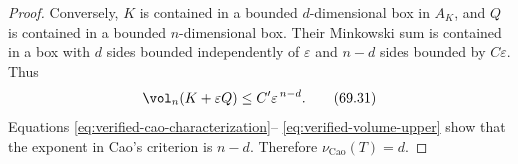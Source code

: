 \begin{proof}
Conversely, \(K\) is contained in a bounded \(d\)-dimensional box in
\(A_K\), and \(Q\) is contained in a bounded \(n\)-dimensional box.
Their Minkowski sum is contained in a box with \(d\) sides bounded
independently of \(\varepsilon\) and \(n-d\) sides bounded by
\(C\varepsilon\). Thus
\[
                \vol_n(K+\varepsilon Q)
                       \leq C'\varepsilon^{\,n-d}.
\tag{69.31}\label{eq:verified-volume-upper}
\]
Equations \eqref{eq:verified-cao-characterization}--
\eqref{eq:verified-volume-upper} show that the exponent in Cao's
criterion is \(n-d\). Therefore
\(\nu_{\mathrm{Cao}}(T)=d\).
\end{proof}
